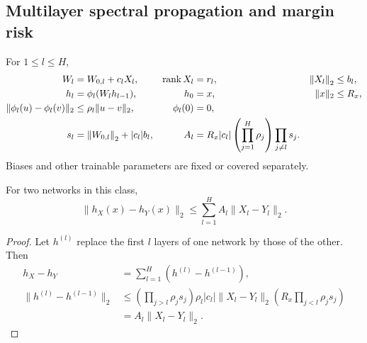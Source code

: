 \subsection{Multilayer spectral propagation and margin risk}
\begin{assumption}
For $1\leq l\leq H$,
\begin{align}
W_l&=W_{0,l}+c_lX_l,&
\operatorname{rank} X_l&=r_l,&
\left\lVert X_l\right\rVert_2&\leq b_l,\\
h_l&=\phi_l(W_lh_{l-1}),&
h_0&=x,&\|x\|_2&\leq R_x,\\
\|\phi_l(u)-\phi_l(v)\|_2&\leq\rho_l\|u-v\|_2,&
\phi_l(0)&=0,\\
s_l&=\left\lVert W_{0,l}\right\rVert_2+|c_l|b_l,&
A_l&=R_x|c_l|\left(\prod_{j=1}^H\rho_j\right)
\prod_{j\ne l}s_j .
\end{align}
Biases and other trainable parameters are fixed or covered separately.
\end{assumption}

\begin{lemma}
\label{lem:network-sensitivity}
For two networks in this class,
\begin{equation}
\|h_X(x)-h_Y(x)\|_2
\leq\sum_{l=1}^H A_l\|X_l-Y_l\|_2.
\label{eq:rigid-network-telescope}
\end{equation}
\end{lemma}
\begin{proof}
Let $h^{(l)}$ replace the first $l$ layers of one network by those of the other.
Then
\begin{align}
h_X-h_Y&=\sum_{l=1}^H(h^{(l)}-h^{(l-1)}),\\
\|h^{(l)}-h^{(l-1)}\|_2
&\leq\left(\prod_{j>l}\rho_js_j\right)\rho_l|c_l|
\|X_l-Y_l\|_2
\left(R_x\prod_{j<l}\rho_js_j\right)\\
&=A_l\|X_l-Y_l\|_2 .
\end{align}
\end{proof}

